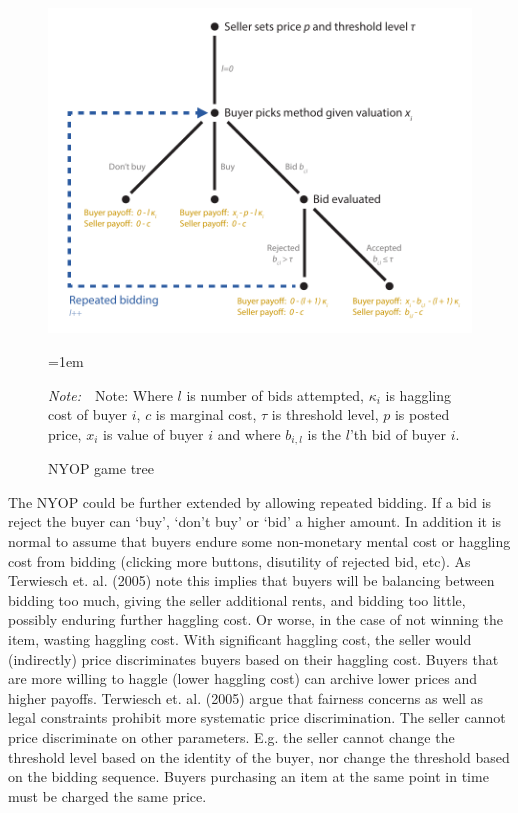 \documentclass[a4paper,12pt]{article}
\newcommand{\Figtext}[1]{%
	\begin{tablenotes}[para,flushleft]
		\hangindent=1em
		\footnotesize
		\raggedright
		#1
	\end{tablenotes}
}
\newcommand{\Fignote}[1]{\Figtext{\emph{Note:~}~#1}}
\begin{document}
	\begin{figure}
	        \centering
	        \caption{NYOP game tree}
	        \includegraphics[width=\textwidth]{Figures/NYOP_GameTree}
			\label{fig:game_tree}
			\Fignote{Note: Where $l$ is number of bids attempted, $\kappa_i$ is haggling cost of buyer $i$, $c$ is marginal cost, $\tau$ is threshold level, $p$ is posted price, $x_i$ is value of buyer $i$ and where $b_{i,l}$ is the $l$'th bid of buyer $i$.}
	\end{figure}

	The NYOP could be further extended by allowing repeated bidding. If a bid is reject the buyer can `buy', `don't buy' or `bid' a higher amount. In addition it is normal to assume that buyers endure some non-monetary mental cost or haggling cost from bidding (clicking more buttons, disutility of rejected bid, etc). As Terwiesch et. al. (2005) note this implies that buyers will be balancing between bidding too much, giving the seller additional rents, and bidding too little, possibly enduring further haggling cost. Or worse, in the case of not winning the item, wasting haggling cost. With significant haggling cost, the seller would (indirectly) price discriminates buyers based on their haggling cost. Buyers that are more willing to haggle (lower haggling cost) can archive lower prices and higher payoffs. Terwiesch et. al. (2005) argue that fairness concerns as well as legal constraints prohibit more systematic price discrimination. The seller cannot price discriminate on other parameters. E.g. the seller cannot change the threshold level based on the identity of the buyer, nor change the threshold based on the bidding sequence. Buyers purchasing an item at the same point in time must be charged the same price.
\end{document}
